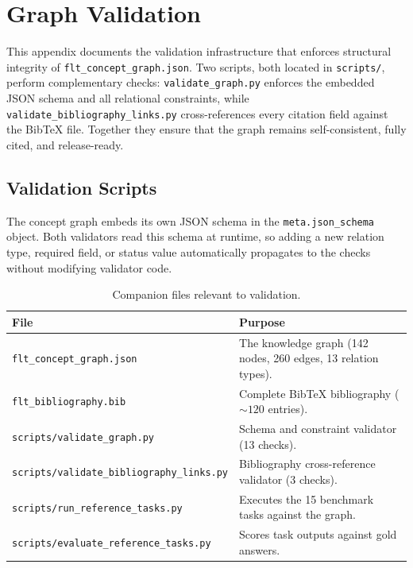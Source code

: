 \chapter{Graph Validation}
\label{app:validation}

This appendix documents the validation infrastructure that enforces structural integrity of \texttt{flt\_concept\_graph.json}.  Two scripts, both located in \texttt{scripts/}, perform complementary checks: \texttt{validate\_graph.py} enforces the embedded JSON schema and all relational constraints, while \texttt{validate\_bibliography\_links.py} cross-references every citation field against the BibTeX file.  Together they ensure that the graph remains self-consistent, fully cited, and release-ready.

\section{Validation Scripts}
\label{sec:validation-scripts}

The concept graph embeds its own JSON schema in the \texttt{meta.json\_schema} object.  Both validators read this schema at runtime, so adding a new relation type, required field, or status value automatically propagates to the checks without modifying validator code.

\begin{table}[ht]
\centering\small
\caption{Companion files relevant to validation.}\label{tab:validation-files}
\begin{tabular}{lp{7.5cm}}
\toprule
\textbf{File} & \textbf{Purpose} \\
\midrule
\texttt{flt\_concept\_graph.json} & The knowledge graph (142 nodes, 260 edges, 13 relation types). \\
\texttt{flt\_bibliography.bib} & Complete BibTeX bibliography (${\sim}120$ entries). \\
\texttt{scripts/validate\_graph.py} & Schema and constraint validator (13 checks). \\
\texttt{scripts/validate\_bibliography\_links.py} & Bibliography cross-reference validator (3 checks). \\
\texttt{scripts/run\_reference\_tasks.py} & Executes the 15 benchmark tasks against the graph. \\
\texttt{scripts/evaluate\_reference\_tasks.py} & Scores task outputs against gold answers. \\
\bottomrule
\end{tabular}
\end{table}

